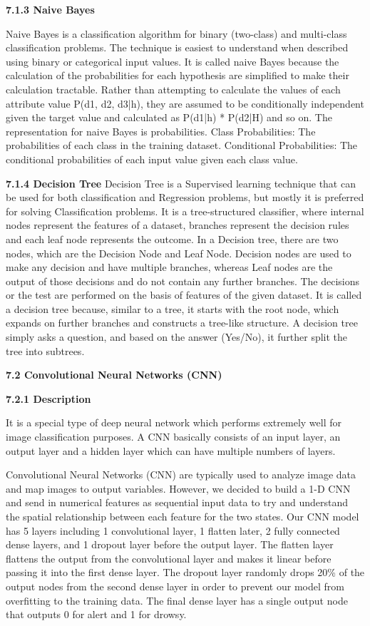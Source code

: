 \documentclass[a4paper,12pt]{article}
\begin{document}
\textbf{7.1.3 Naive Bayes}

Naive Bayes is a classification algorithm for binary (two-class) and multi-class classification problems. The technique is easiest to understand when described using binary or categorical input values. It is called naive Bayes because the calculation of the probabilities for each hypothesis are simplified to make their calculation tractable. Rather than attempting to calculate the values of each attribute value P(d1, d2, d3|h), they are assumed to be conditionally independent given the target value and calculated as P(d1|h) * P(d2|H) and so on. The representation for naive Bayes is probabilities.
Class Probabilities: The probabilities of each class in the training dataset.
Conditional Probabilities: The conditional probabilities of each input value given each class value.

\textbf{7.1.4 Decision Tree}
Decision Tree is a Supervised learning technique that can be used for both classification and Regression problems, but mostly it is preferred for solving Classification problems. It is a tree-structured classifier, where internal nodes represent the features of a dataset, branches represent the decision rules and each leaf node represents the outcome. In a Decision tree, there are two nodes, which are the Decision Node and Leaf Node. Decision nodes are used to make any decision and have multiple branches, whereas Leaf nodes are the output of those decisions and do not contain any further branches. The decisions or the test are performed on the basis of features of the given dataset. It is called a decision tree because, similar to a tree, it starts with the root node, which expands on further branches and constructs a tree-like structure. A decision tree simply asks a question, and based on the answer (Yes/No), it further split the tree into subtrees.

\textbf{7.2 Convolutional Neural Networks (CNN)}

\textbf{7.2.1 Description}

It is a special type of deep neural network which performs extremely
well for image classification purposes. A CNN basically consists of an
input layer, an output layer and a hidden layer which can have multiple
numbers of layers.

Convolutional Neural Networks (CNN) are typically used to analyze image
data and map images to output variables. However, we decided to build a
1-D CNN and send in numerical features as sequential input data to try
and understand the spatial relationship between each feature for the two
states. Our CNN model has 5 layers including 1 convolutional layer, 1
flatten later, 2 fully connected dense layers, and 1 dropout layer
before the output layer. The flatten layer flattens the output from the
convolutional layer and makes it linear before passing it into the first
dense layer. The dropout layer randomly drops 20\% of the output nodes
from the second dense layer in order to prevent our model from
overfitting to the training data. The final dense layer has a single
output node that outputs 0 for alert and 1 for drowsy.
\end{document}
